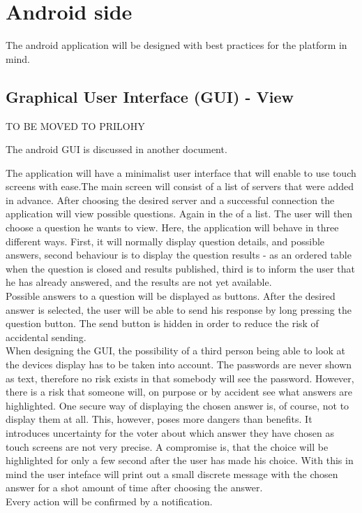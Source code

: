 \documentclass[11pt,twoside,a4paper]{book}
\begin{document}
\section{Android side}
The android application will be designed with best practices for the platform in mind.

\subsection{Graphical User Interface (GUI) - View}
TO BE MOVED TO PRILOHY

The android GUI is discussed in another document.





The application will have a minimalist user interface that will enable to use touch screens with ease.The main screen will consist of a list of servers that were added in advance. After choosing the desired server and a successful connection the application will view possible questions. Again in the of a list. The user will then choose a question he wants to view. Here, the application will behave in three different ways. First, it will normally display question details, and possible answers, second behaviour is to display the question results - as an ordered table when the question is closed and results published, third is to inform the user that he has already answered, and the results are not yet available.  \\
Possible answers to a question will be displayed as  buttons. After the desired answer is selected, the user will be able to send his response by long pressing the question button. The send button is hidden in order to reduce the risk of accidental sending. \\
When designing the GUI, the possibility of a third person being able to look at the devices display has to be taken into account. The passwords are never shown as text, therefore no risk exists in that somebody will see the password. However, there is a risk that someone will, on purpose or by accident see what answers are highlighted. One secure way of displaying the chosen answer is, of course, not to display them at all. This, however, poses more dangers than benefits. It introduces uncertainty for the voter about which answer they have chosen as touch screens are not very precise. A compromise is, that the choice will be highlighted for only a few second after the user has made his choice. With this in mind the user inteface will print out a small discrete message with the chosen answer for a shot amount of time after choosing the answer. \\
Every action will be confirmed by a notification.\cite{bakalarkaJV}	
\end{document}
